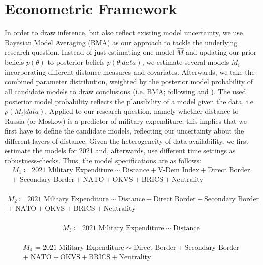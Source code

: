 \documentclass[12pt,a4paper]{article}
\begin{document}
\section{Econometric Framework}
In order to draw inference, but also reflect existing model uncertainty, we use Bayesian Model Averaging (BMA) as our approach to tackle the underlying research question.  Instead of just estimating one model $\hat{M}$ and updating our prior beliefs $p(\theta)$ to posterior beliefs $p(\theta \vert data)$, we estimate several models $M_{i}$ incorporating different distance measures and covariates. Afterwards, we take the combined parameter distribution, weighted by the posterior model probability of all candidate models to draw conclusions (i.e. BMA; following \citealp{jeffreys1939} and \citealp{jevons1874}). The used posterior model probability reflects the plausibility of a model given the data, i.e. $p(M_{i} \vert data)$.
\clearpage 
Applied to our research question, namely whether distance to Russia (or Moskow) is a predictor of military expenditure, this implies that we first have to define the candidate models, reflecting our uncertainty about the different layers of distance. Given the heterogeneity of data availability, we first estimate the models for 2021 and, afterwards, use different time settings as robustness-checks. Thus, the model specifications are as follows: 
\begin{align}
 M_1 \coloneqq \textrm{2021 Military Expenditure} \sim \textrm{Distance} + \textrm{V-Dem Index} + \textrm{Direct Border} \\ +  \textrm{ Secondary Border} +  \textrm{NATO} + \textrm{OKVS} + \textrm{BRICS} + \textrm{Neutrality} \nonumber
\end{align}\\[-3.1em]
\begin{align}
 M_2 \coloneqq \textrm{2021 Military Expenditure} \sim \textrm{Distance} + \textrm{Direct Border} + \textrm{Secondary Border} \\ + \textrm{ NATO} + \textrm{OKVS} + \textrm{BRICS} + \textrm{Neutrality} \nonumber
\end{align}\\[-3.1em]
\begin{align}
M_3 \coloneqq \textrm{2021 Military Expenditure} \sim \textrm{Distance} 
\end{align}\\[-3.1em]
\begin{align}
  M_4 \coloneqq \textrm{2021 Military Expenditure} \sim \textrm{Direct Border} + \textrm{Secondary Border} \\ + \textrm{ NATO} + \textrm{OKVS} + \textrm{BRICS} + \textrm{Neutrality} \nonumber
\end{align}
\end{document}
